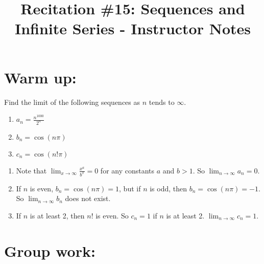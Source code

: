 \documentclass[handout,instructornotes]{ximera}
\title{Recitation \#15: Sequences and Infinite Series - Instructor Notes}
\begin{document}
\begin{abstract}		\end{abstract}
\maketitle



\section{Warm up:}
Find the limit of the following sequences as $n$ tends to $\infty$. 
\begin{enumerate}

\item $a_n = \frac{n^{1000}}{2^n}$

	
\item $b_n = \cos (n \pi)$

\item $c_n = \cos (n! \pi)$

\end{enumerate}
	\begin{freeResponse}
\begin{enumerate}	
\item Note that $\lim_{x \to \infty} \frac{x^a}{b^x} = 0$ for any constants $a$ and $b>1$. So $\lim_{n \to \infty} a_n =0$.
\item If $n$ is even, $b_n = \cos(n \pi) = 1$, but if $n$ is odd, then $b_n = \cos(n \pi) = -1$. So $\lim_{n \to \infty} b_n$ does not exist.
\item If $n$ is at least 2, then $n!$ is even. So $c_n = 1$ if $n$ is at least 2. $\lim_{n \to \infty} c_n = 1$. 
\end{enumerate}
	\end{freeResponse}
\begin{instructorNotes}

\end{instructorNotes}







\section{Group work:}
\end{document}
